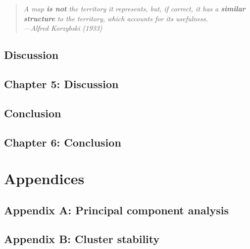 \documentclass[12pt, TexShade, letterpaper]{report}
\makeatletter
\newcommand{\unchapter}[1]{%
  \begingroup
  \let\@makechapterhead\@gobble %
  \chapter{#1}
  \endgroup
}
\makeatother
\begin{document}
\pagebreak
\hspace{0pt}
\vfill

\begin{center}
\begin{quote} 
\begin{singlespace}
\textit{A map \textbf{is not} the territory it represents, but, if correct, it has a \textbf{similar structure} to the territory, which accounts for its usefulness.\\
---Alfred Korzybski (1933)}
\end{singlespace}
\end{quote}
\end{center}

\vfill
\hspace{0pt}
\pagebreak

\begin{refsection}
\unchapter{Discussion}
\chapter*{Chapter 5: Discussion}
\label{chap:discussion}


\unchapter{Conclusion}
\chapter*{Chapter 6: Conclusion}
\label{chap:conclusion}

\printbibliography[heading=subbibintoc]
\end{refsection}


%

\newpage

%
%








%
%

\appendix

\part{Appendices}
\chapter*{Appendix A: Principal component analysis}
\label{appendix:AppendixA}


\chapter*{Appendix B: Cluster stability}
\label{appendix:AppendixB}

\end{document}
